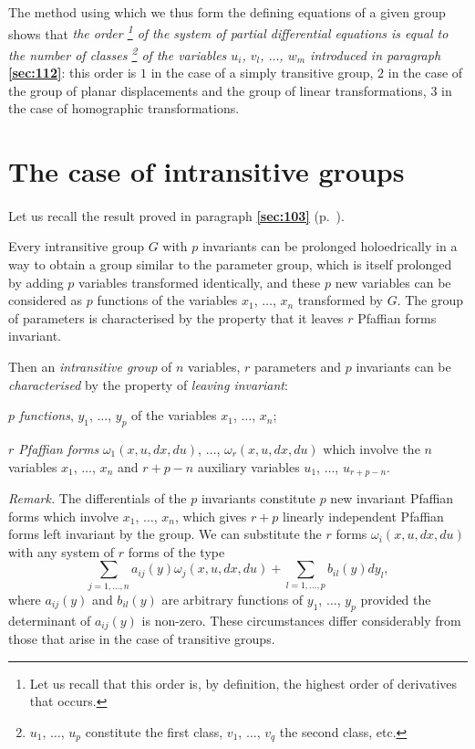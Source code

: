 \documentclass[leqno,11pt]{book}
\numberwithin{equation}{chapter}
\theoremstyle{shape1}
\theoremstyle{shapesmall}
\newcommand{\fsref}[1]{{\rm\textsection\textbf{\ref{sec:#1}}}}
\newcommand{\somespace}{\vspace{9pt}}
\begin{document}
\somespace

The method using which we thus form the defining equations of a given group shows that \emph{the order \footnote{Let us recall that this order is, by definition, the highest order of derivatives that occurs.} of the system of partial differential equations is equal to the number of classes \footnote{$u_{1}$, $\dots$, $u_{p}$ constitute the first class, $v_{1}$, $\dots$, $v_{q}$ the second class, etc.} of the variables $u_{i}$, $v_{l}$, $\dots$, $w_{m}$ introduced in paragraph} \fsref{112}: this order is $1$ in the case of a simply transitive group, $2$ in the case of the group of planar displacements and the group of linear transformations, $3$ in the case of homographic transformations.

\section{The case of intransitive groups}
\label{sec:case-intr-groups}

\paragraph{}
\label{sec:114}
Let us recall the result proved in paragraph \fsref{103} (p.~\pageref{sec:103}).

Every intransitive group $G$ with $p$ invariants can be prolonged holoedrically in a way to obtain a group similar to the parameter group, which is itself prolonged  by adding $p$ variables transformed identically, and these $p$ new variables  can be considered as $p$ functions of the variables $x_{1}$, $\dots$, $x_{n}$ transformed by $G$. The group of parameters is characterised by the property that it leaves $r$ Pfaffian forms invariant.

Then an \emph{intransitive group} of $n$ variables, $r$ parameters and $p$ invariants can be \emph{characterised} by the property of \emph{leaving invariant}:

\somespace

\emph{$p$ functions}, $y_{1}$, $\dots$, $y_{p}$ of the variables $x_{1}$, $\dots$, $x_{n}$;

\emph{$r$ Pfaffian forms} $\omega_{1}(x,u,dx,du)$, $\dots$, $\omega_{r}(x,u,dx,du)$ which involve the $n$ variables $x_{1}$, $\dots$, $x_{n}$ and $r+p-n$ auxiliary variables $u_{1}$, $\dots$, $u_{r+p-n}$.

\somespace

\emph{Remark.} The differentials of the $p$ invariants constitute $p$ new invariant Pfaffian forms which involve $x_{1}$, $\dots$, $x_{n}$, which gives $r+p$ linearly independent Pfaffian forms left invariant by the group. We can substitute the $r$ forms $\omega_{i}(x,u,dx,du)$ with any system of $r$ forms of the type
\[
\sum_{j=1,\dots,n}a_{ij}(y)\omega_{j}(x,u,dx,du)+\sum_{l=1,\dots,p}b_{il}(y)dy_{l},
\]
where $a_{ij}(y)$ and $b_{il}(y)$ are arbitrary functions of $y_{1}$, $\dots$, $y_{p}$ provided the determinant of $a_{ij}(y)$ is non-zero. These circumstances differ considerably from those that arise in the case of transitive groups.
\end{document}

